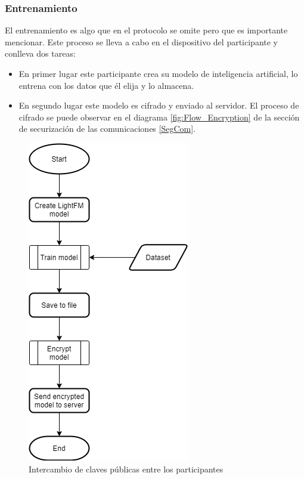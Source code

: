 \subsubsection{Entrenamiento}
El entrenamiento es algo que en el protocolo se omite pero que es importante mencionar. Este proceso se lleva a cabo en el dispositivo del participante y conlleva dos tareas:
\begin{itemize}
    \item En primer lugar este participante crea su modelo de inteligencia artificial, lo entrena con los datos que él elija y lo almacena.
    \item En segundo lugar este modelo es cifrado y enviado al servidor. El proceso de cifrado se puede observar en el diagrama \ref{fig:Flow_Encryption} de la sección de securización de las comunicaciones \ref{SegCom}.
\end{itemize} 
\begin{figure}[H]
    \centering
    \includegraphics[height=0.6\textheight]{Figuras/flowchart_train.png}    
    \caption{Intercambio de claves públicas entre los participantes} 
    \label{fig:PublicKeyShare}
\end{figure}

